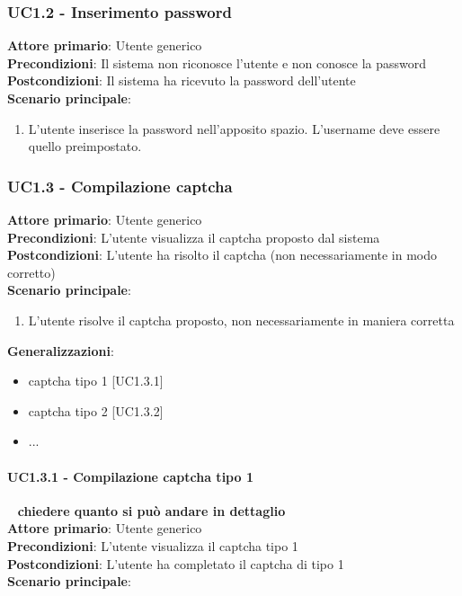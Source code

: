 \subsubsection{UC1.2 - Inserimento password}
\textbf{Attore primario}: Utente generico\\
\textbf{Precondizioni}: Il sistema non riconosce l'utente e non conosce la password\\
\textbf{Postcondizioni}: Il sistema ha ricevuto la password dell'utente\\

\textbf{Scenario principale}:
\begin{enumerate}
   \item L'utente inserisce la password nell'apposito spazio. L'username deve essere quello preimpostato.
\end{enumerate}

\subsubsection{UC1.3 - Compilazione captcha}
\textbf{Attore primario}: Utente generico\\
\textbf{Precondizioni}: L'utente visualizza il captcha proposto dal sistema\\
\textbf{Postcondizioni}: L'utente ha risolto il captcha (non necessariamente in modo corretto)\\

\textbf{Scenario principale}:
\begin{enumerate}
   \item L'utente risolve il captcha proposto, non necessariamente in maniera corretta
\end{enumerate}
\textbf{Generalizzazioni}:
\begin{itemize}
   \item captcha tipo 1 [UC1.3.1]
   \item captcha tipo 2 [UC1.3.2]
   \item ...
\end{itemize}

\paragraph{UC1.3.1 - Compilazione captcha tipo 1 }~\smallskip
\textbf{chiedere quanto si può andare in dettaglio}\\
\textbf{Attore primario}: Utente generico\\
\textbf{Precondizioni}: L'utente visualizza il captcha tipo 1\\
\textbf{Postcondizioni}: L'utente ha completato il captcha di tipo 1\\
\textbf{Scenario principale}:

